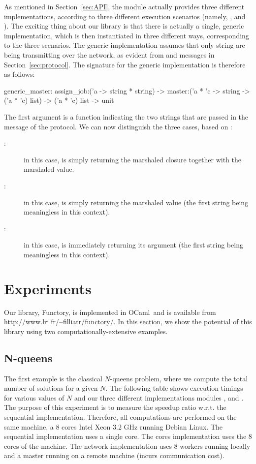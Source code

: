 \documentclass[preprint]{sigplanconf}
\newcommand{\Ocaml}{OCaml}
\newcommand{\functory}{\textsf{Functory}}
\begin{document}
As mentioned in Section~\ref{sec:API}, the  module
actually provides three different implementations, according to three
different execution scenarios (namely, ,  and
). The exciting thing about our library is that there is
actually a single, generic implementation, which is then instantiated
in three different ways, corresponding to the three scenarios.  The
generic implementation assumes that only string are being transmitting
over the network, as evident from  and 
messages in Section~\ref{sec:protocol}.  The signature for the generic
implementation is therefore as follows:
\begin{ocaml}
  generic_master:
    assign_job:('a -> string * string) ->
    master:('a * 'c -> string -> ('a * 'c) list)  ->
    ('a * 'c) list -> unit
\end{ocaml}
The first argument  is a function indicating the two
strings that are passed in the  message of the protocol.
We can now distinguish the three cases, based on :
\begin{description}
\item[:] in this case,  is simply returning
  the marshaled closure together with the marshaled value.
\item[:] in this case,  is simply
  returning the marshaled value (the first string being meaningless in
  this context).
\item[:] in this case,  is immediately
  returning its argument (the first string being meaningless in
  this context).
\end{description}

\section{Experiments}\label{sec:experiments}

Our library, \functory, is implemented in \Ocaml\ and is available
from \url{http://www.lri.fr/~filliatr/functory/}.
In this section, we show the potential of this library using two 
computationally-extensive examples.

\subsection{N-queens}

The first example is the classical $N$-queens problem, where we
compute the total number of solutions for a given $N$.
The following table shows execution timings for various values of $N$
and our three different implementations modules ,  and
. The purpose of this experiment is to measure the speedup
ratio w.r.t. the sequential implementation. Therefore, all
computations are performed on the same machine, a 8 cores Intel Xeon
3.2 GHz running Debian Linux. The sequential implementation uses a
single core. The cores implementation uses the 8 cores of
the machine. The network implementation uses 8 workers running locally and
a master running on a remote machine (incurs communication cost).
\end{document}
